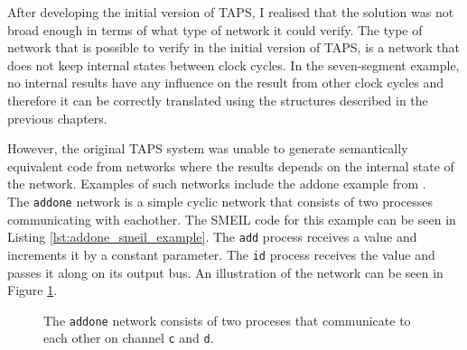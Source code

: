 After developing the initial version of TAPS, I realised that the solution was not broad enough in terms of what type of network it could verify. The type of network that is possible to verify in the initial version of TAPS, is a network that does not keep internal states between clock cycles. In the seven-segment example, no internal results have any influence on the result from other clock cycles and therefore it can be correctly translated using the structures described in the previous chapters.

However, the original TAPS system was unable to generate semantically equivalent \cspm{} code from networks where the results depends on the internal state of the network. Examples of such networks include the addone example from \cite{smeil}.\\

The \texttt{addone} network is a simple cyclic network that consists of two processes communicating with eachother. The SMEIL code for this example can be seen in Listing \ref{lst:addone_smeil_example}. The \texttt{add} process receives a value and increments it by a constant parameter. The \texttt{id} process receives the value and passes it along on its output bus.
An illustration of the network can be seen in Figure \ref{fig:addone_unclocked}.\\
\begin{figure}
    \centering
    \caption{The \texttt{addone} network consists of two proceses that communicate to each other on channel \texttt{c} and \texttt{d}.}
    \label{fig:addone_unclocked}
\end{figure}

